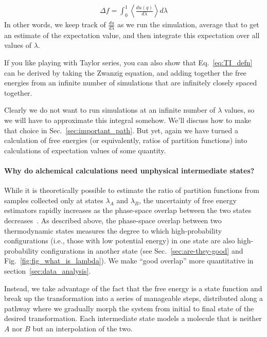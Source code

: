 \documentclass[9pt,bestpractices]{livecoms}
\begin{document}
\begin{eqnarray}
  \Delta f = \int_0^1 \left \langle \frac{du(q)}{d\lambda} \right \rangle d\lambda \label{eq:TI_defn}
\end{eqnarray}
In other words, we keep track of $\frac{du}{d\lambda}$ as we run the
simulation, average that to get an estimate of the expectation value,
and then integrate this expectation over all values of $\lambda$.

If you like playing with Taylor series, you can also show that Eq.~\ref{eq:TI_defn} can be derived by taking the Zwanzig equation,
and adding together the free energies from an infinite number of simulations that are infinitely closely spaced together. 

Clearly we do not want to run simulations at an infinite number of
$\lambda$ values, so we will have to approximate this integral
somehow. We'll discuss how to make that choice in
Sec.~\ref{sec:important_path}. But yet, again we have turned a calculation of
free energies (or equivalently, ratios of partition functions) into
calculations of expectation values of some quantity.

\paragraph{Why do alchemical calculations need unphysical intermediate states?}

While it is theoretically possible to estimate the ratio of partition functions from samples collected only at states $\lambda_A$ and $\lambda_B$, the uncertainty of free energy estimators rapidly increases as the phase-space overlap between the two states decreases~\cite{wu2005phasespace, wu2005phasespacea}. As described above, the phase-space overlap between two thermodynamic states measures the degree to which high-probability configurations (i.e., those with low potential energy) in one state are also high-probability configurations in another state (see Sec.~\ref{sec:are-they-good} and Fig.~\ref{fig:fig_what_is_lambda}). We make ``good overlap'' more quantitative in section~\ref{sec:data_analysis}.

Instead, we take advantage of the fact that the free energy is a state function and break up the transformation into a series of manageable steps, distributed along a pathway where we gradually morph the system from initial to final state of the desired transformation. Each intermediate state models a molecule that is neither $A$ nor $B$ but an interpolation of the two.
\end{document}
